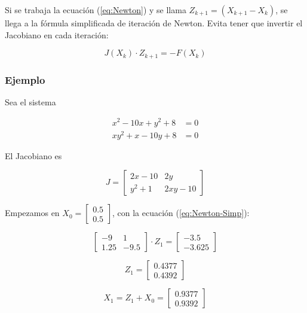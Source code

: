 \documentclass{article}
\begin{document}
Si se trabaja la ecuación (\ref{eq:Newton}) y se llama 
$Z_{k+1} = \left(X_{k+1} - X_k\right)$, se llega a la fórmula simplificada de 
iteración de Newton. Evita tener que invertir el Jacobiano en cada iteración:

\begin{equation}\label{eq:Newton-Simp}
    J\left(X_k\right)\cdot Z_{k+1} = -F\left(X_k\right)
\end{equation}

\subsubsection{Ejemplo}

Sea el sistema

\begin{align*}
    x^2 - 10x + y^2 + 8 &= 0 \\
    xy^2 + x - 10y + 8 &= 0
\end{align*}

El Jacobiano es

\begin{equation*}
    J = \begin{bmatrix}
    2x-10 & 2y \\
    y^2 + 1 & 2xy - 10
    \end{bmatrix}
\end{equation*}

Empezamos en $X_0 = \begin{bmatrix}0.5\\0.5\end{bmatrix}$, con la ecuación 
(\ref{eq:Newton-Simp}):

\begin{equation*}
    \begin{bmatrix}
    -9 & 1 \\
    1.25 & -9.5
    \end{bmatrix} \cdot Z_{1} = \begin{bmatrix}
    -3.5 \\
    -3.625
    \end{bmatrix}
\end{equation*}

\begin{equation*}
    Z_{1} = \begin{bmatrix}
    0.4377 \\ 0.4392
    \end{bmatrix}
\end{equation*}

\begin{equation*}
    X_1 = Z_1 + X_0 = \begin{bmatrix}
    0.9377 \\
    0.9392
    \end{bmatrix}
\end{equation*}
\end{document}
